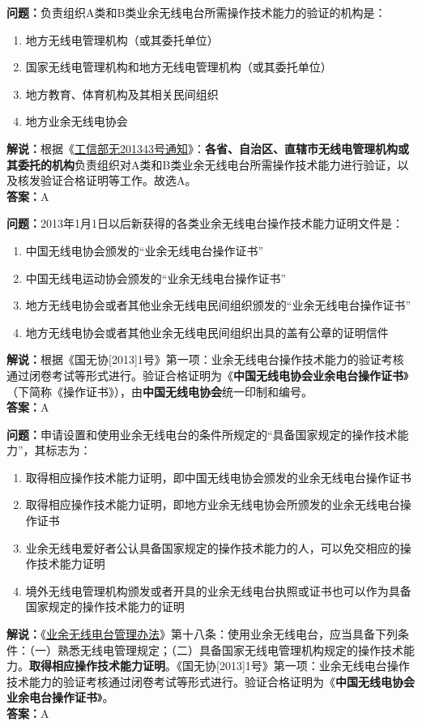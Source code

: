 \textbf{问题：}负责组织A类和B类业余无线电台所需操作技术能力的验证的机构是：
\begin{enumerate}[label=\Alph*), leftmargin=1.5cm]
	\item 地方无线电管理机构（或其委托单位）
	\item 国家无线电管理机构和地方无线电管理机构（或其委托单位）
	\item 地方教育、体育机构及其相关民间组织
	\item 地方业余无线电协会
\end{enumerate}
\textbf{解说：}根据《\href{http://www.crac.org.cn/wp-content/uploads/2013/02/%E5%B7%A5%E4%BF%A1%E9%83%A8%E6%97%A0201343%E5%8F%B7.pdf}{工信部无201343号通知}》：\textbf{各省、自治区、直辖市无线电管理机构或其委托的机构}负责组织对A类和B类业余无线电台所需操作技术能力进行验证，以及核发验证合格证明等工作。故选A。\\\textbf{答案：}A

\textbf{问题：}2013年1月1日以后新获得的各类业余无线电台操作技术能力证明文件是：
\begin{enumerate}[label=\Alph*), leftmargin=1.5cm]
	\item 中国无线电协会颁发的“业余无线电台操作证书”
	\item 中国无线电运动协会颁发的“业余无线电台操作证书”
	\item 地方无线电协会或者其他业余无线电民间组织颁发的“业余无线电台操作证书”
	\item 地方无线电协会或者其他业余无线电民间组织出具的盖有公章的证明信件
\end{enumerate}
\textbf{解说：}根据《国无协[2013]1号》第一项：业余无线电台操作技术能力的验证考核通过闭卷考试等形式进行。验证合格证明为《\textbf{中国无线电协会业余电台操作证书}》（下简称《操作证书》），由\textbf{中国无线电协会}统一印制和编号。\\\textbf{答案：}A

\textbf{问题：}申请设置和使用业余无线电台的条件所规定的“具备国家规定的操作技术能力”，其标志为：
\begin{enumerate}[label=\Alph*), leftmargin=1.5cm]
	\item 取得相应操作技术能力证明，即中国无线电协会颁发的业余无线电台操作证书
	\item 取得相应操作技术能力证明，即地方业余无线电协会所颁发的业余无线电台操作证书
	\item 业余无线电爱好者公认具备国家规定的操作技术能力的人，可以免交相应的操作技术能力证明
	\item 境外无线电管理机构颁发或者开具的业余无线电台执照或证书也可以作为具备国家规定的操作技术能力的证明
\end{enumerate}
\textbf{解说：}《\href{https://www.miit.gov.cn/jgsj/zfs/bmgz/art/2020/art_147b69815b3641caad9047735f94c860.html}{业余无线电台管理办法}》第十八条：使用业余无线电台，应当具备下列条件：（一）熟悉无线电管理规定；（二）具备国家无线电管理机构规定的操作技术能力。\textbf{取得相应操作技术能力证明}。《国无协[2013]1号》第一项：业余无线电台操作技术能力的验证考核通过闭卷考试等形式进行。验证合格证明为《\textbf{中国无线电协会业余电台操作证书}》。\\\textbf{答案：}A

